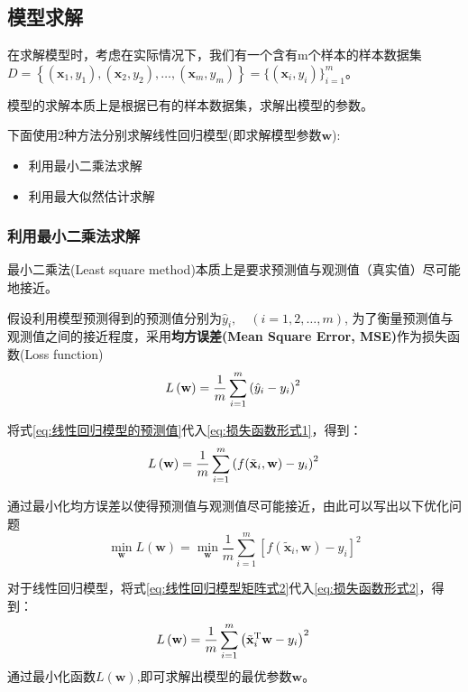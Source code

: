 \documentclass[withoutpreface,bwprint]{NoteBook}
\begin{document}
\subsection{模型求解}
在求解模型时，考虑在实际情况下，我们有一个含有m个样本的样本数据集
$D=\left\{ (\mathbf{x}_1,y_1), (\mathbf{x}_2,y_2),\dots, (\mathbf{x}_m,y_m) \right\} = \{ (\mathbf{x}_i,y_i) \}_{i=1}^{m}$。

模型的求解本质上是根据已有的样本数据集，求解出模型的参数。

下面使用2种方法分别求解线性回归模型(即求解模型参数$\mathbf{w}$):
\begin{itemize}
    \item 利用最小二乘法求解
    \item 利用最大似然估计求解
\end{itemize}

\subsubsection{利用最小二乘法求解}

最小二乘法(Least square method)本质上是要求预测值与观测值（真实值）尽可能地接近。

假设利用模型预测得到的预测值分别为$\hat{y}_i ,\quad (i=1,2,\dots, m) $,
为了衡量预测值与观测值之间的接近程度，采用\textbf{均方误差(Mean Square Error, MSE)}作为损失函数(Loss function)
\begin{equation}
    \label{eq:损失函数形式1}
    L\left ( \mathbf{w} \right ) = \frac{1}{m}\sum_{i=1}^{m} \left ( \hat{y}_i-y_i \right )^2 \\
\end{equation}

将式\cref{eq:线性回归模型的预测值}代入\cref{eq:损失函数形式1}，得到：
\begin{equation}
    \label{eq:损失函数形式2}
    L\left ( \mathbf{w} \right ) = \frac{1}{m}\sum_{i=1}^{m} \left (f(\tilde{\mathbf{x}}_i,\mathbf{w}) - y_i \right )^2 \\
\end{equation}

通过最小化均方误差以使得预测值与观测值尽可能接近，由此可以写出以下优化问题
\begin{equation}
    \min_{\mathbf{w}} L\left ( \mathbf{w} \right )  = \min_{\mathbf{w}} \frac{1}{m}\sum_{i=1}^{m} \left [ f(\tilde{\mathbf{x}}_i,\mathbf{w}) - y_i \right ]^2    
\end{equation}


对于线性回归模型，将式\cref{eq:线性回归模型矩阵式2}代入\cref{eq:损失函数形式2}，得到：
\begin{equation}
    \label{eq:线性回归模型损失函数形式}
    L\left ( \mathbf{w} \right ) = \frac{1}{m}\sum_{i=1}^{m} \left (\tilde{\mathbf{x}}_i^\mathrm{T} \mathbf{w}   -y_i \right )^2 \\
\end{equation}
通过最小化函数$L(\mathbf{w})$,即可求解出模型的最优参数$\mathbf{w}$。
\end{document}
